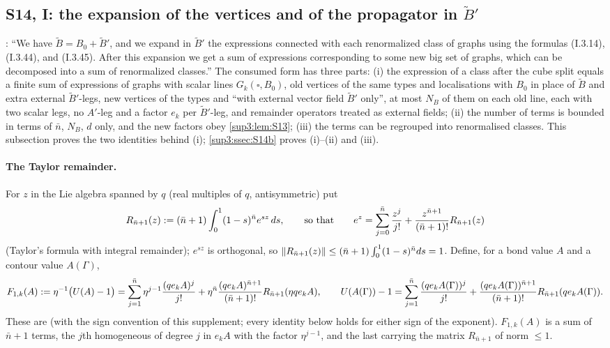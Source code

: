 
\subsection{S14, I: the expansion of the vertices and of the propagator in $\tilde B'$}\label{sup3:ssec:S14a}

\cite[p.~433]{Ba3}: ``We have $\tilde B=B_0+\tilde B'$, and we expand in $\tilde B'$ the expressions connected with each renormalized class of graphs using the formulas (I.3.14), (I.3.44), and (I.3.45). After this expansion we get a sum of expressions corresponding to some new big set of graphs, which can be decomposed into a sum of renormalized classes.'' The consumed form has three parts: (i) the expression of a class after the cube split equals a finite sum of expressions of graphs with scalar lines $G_k(\square,B_0)$, old vertices of the same types and localisations with $B_0$ in place of $\tilde B$ and extra external $\tilde B'$-legs, new vertices of the types \cite[(1.8)--(1.11)]{Ba3} and \cite[(1.13)--(1.15)]{Ba3} ``with external vector field $\tilde B'$ only'', at most $N_B$ of them on each old line, each with two scalar legs, no $A'$-leg and a factor $e_k$ per $\tilde B'$-leg, and remainder operators treated as external fields; (ii) the number of terms is bounded in terms of $\bar n$, $N_B$, $d$ only, and the new factors obey \cref{sup3:lem:S13}; (iii) the terms can be regrouped into renormalised classes. This subsection proves the two identities behind (i); \cref{sup3:ssec:S14b} proves (i)--(ii) and (iii).

\paragraph{The Taylor remainder.} For $z$ in the Lie algebra spanned by $q$ (real multiples of $q$, antisymmetric) put
\[
R_{\bar n+1}(z):=(\bar n+1)\int_0^1(1-s)^{\bar n}e^{sz}\,ds,\qquad\text{so that}\qquad e^z=\sum_{j=0}^{\bar n}\frac{z^j}{j!}+\frac{z^{\bar n+1}}{(\bar n+1)!}R_{\bar n+1}(z)
\]
(Taylor's formula with integral remainder); $e^{sz}$ is orthogonal, so $\lVert R_{\bar n+1}(z)\rVert\le(\bar n+1)\int_0^1(1-s)^{\bar n}ds=1$. Define, for a bond value $A$ and a contour value $A(\Gamma)$,
\[
F_{1,k}(A):=\eta^{-1}\big(U(A)-1\big)=\sum_{j=1}^{\bar n}\eta^{j-1}\frac{(qe_kA)^j}{j!}+\eta^{\bar n}\frac{(qe_kA)^{\bar n+1}}{(\bar n+1)!}R_{\bar n+1}(\eta qe_kA),\qquad
U(A(\Gamma))-1=\sum_{j=1}^{\bar n}\frac{(qe_kA(\Gamma))^j}{j!}+\frac{(qe_kA(\Gamma))^{\bar n+1}}{(\bar n+1)!}R_{\bar n+1}(qe_kA(\Gamma)).
\]
These are \cite[(3.14)--(3.15)]{Ba1} (with the sign convention of this supplement; every identity below holds for either sign of the exponent). $F_{1,k}(A)$ is a sum of $\bar n+1$ terms, the $j$th homogeneous of degree $j$ in $e_kA$ with the factor $\eta^{j-1}$, and the last carrying the matrix $R_{\bar n+1}$ of norm $\le1$.

